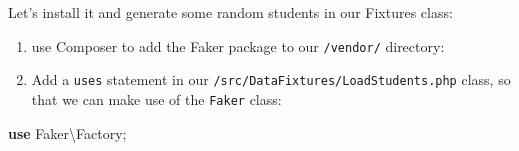 \documentclass[a4paperpaper,openright]{book}
\newenvironment{Shaded}{}{}
\newcommand{\ExtensionTok}[1]{#1}
\newcommand{\KeywordTok}[1]{\textcolor[rgb]{0.00,0.44,0.13}{\textbf{#1}}}
\newcommand{\NormalTok}[1]{#1}
\newcommand{\OtherTok}[1]{\textcolor[rgb]{0.00,0.44,0.13}{#1}}
\begin{document}
Let's install it and generate some random students in our Fixtures
class:

\begin{enumerate}
\def\labelenumi{\arabic{enumi}.}
\item
  use Composer to add the Faker package to our \texttt{/vendor/}
  directory:

\begin{Shaded}
\end{Shaded}
\item
  Add a \texttt{uses} statement in our
  \texttt{/src/DataFixtures/LoadStudents.php} class, so that we can make
  use of the \texttt{Faker} class:
\end{enumerate}

\begin{Shaded}
\begin{Highlighting}[]
    \KeywordTok{use}\NormalTok{ Faker\textbackslash{}Factory}\OtherTok{;}
\end{Highlighting}
\end{Shaded}
\end{document}
